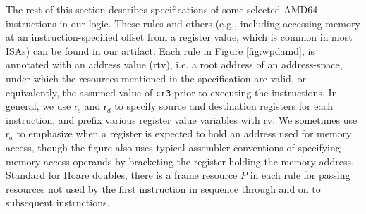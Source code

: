 \documentclass[acmsmall,screen,nonacm]{acmart}
\begin{document}
The rest of this section describes specifications of some selected \textsf{AMD64} instructions 
in our logic. 
These rules and others (e.g., including accessing memory at an instruction-specified offset from a register
value, which is common in most ISAs)
can be found in our artifact.
Each rule in Figure \ref{fig:wpdamd}, 
is annotated with an address value (\textsf{rtv}), 
i.e. a root address of an address-space, under which the resources mentioned in the specification are valid,
or equivalently, the assumed value of \lstinline|cr3| prior to executing the instructions.
In general, we use $\textsf{r}_s$ and $\textsf{r}_d$ to specify source and destination registers
for each instruction, and prefix various register value variables with \textsf{rv}.
We sometimes use $\textsf{r}_a$ to emphasize when a register is expected to hold an address used
for memory access, though the figure also uses typical assembler conventions of specifying
memory access operands by bracketing the register holding the memory address.
Standard for Hoare doubles, there is a frame resource $P$ in each rule for passing resources
not used by the first instruction in sequence through and on to subsequent instructions.
\end{document}
